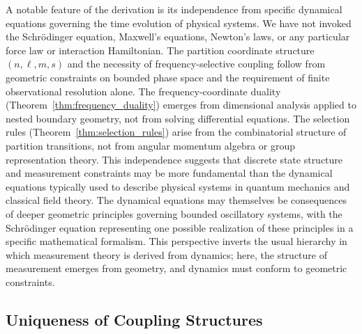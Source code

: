 \documentclass[twocolumn,10pt,a4paper]{article}
\theoremstyle{remark}
\begin{document}
A notable feature of the derivation is its independence from specific dynamical equations governing the time evolution of physical systems. We have not invoked the Schrödinger equation, Maxwell's equations, Newton's laws, or any particular force law or interaction Hamiltonian. The partition coordinate structure $(n, \ell, m, s)$ and the necessity of frequency-selective coupling follow from geometric constraints on bounded phase space and the requirement of finite observational resolution alone. The frequency-coordinate duality (Theorem~\ref{thm:frequency_duality}) emerges from dimensional analysis applied to nested boundary geometry, not from solving differential equations. The selection rules (Theorem~\ref{thm:selection_rules}) arise from the combinatorial structure of partition transitions, not from angular momentum algebra or group representation theory. This independence suggests that discrete state structure and measurement constraints may be more fundamental than the dynamical equations typically used to describe physical systems in quantum mechanics and classical field theory. The dynamical equations may themselves be consequences of deeper geometric principles governing bounded oscillatory systems, with the Schrödinger equation representing one possible realization of these principles in a specific mathematical formalism. This perspective inverts the usual hierarchy in which measurement theory is derived from dynamics; here, the structure of measurement emerges from geometry, and dynamics must conform to geometric constraints.

\subsection{Uniqueness of Coupling Structures}
\end{document}

